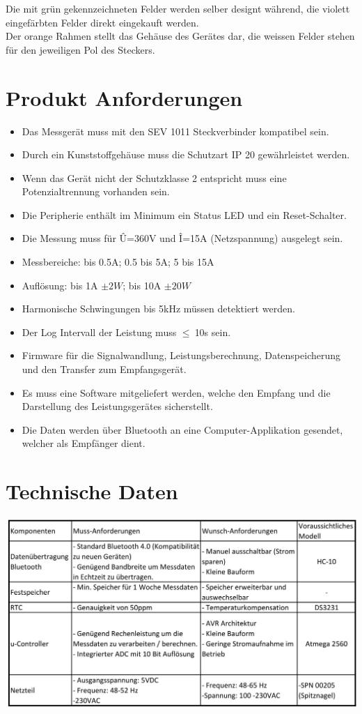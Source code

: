 \documentclass[12pt,a4paper]{article}
\begin{document}
Die mit grün gekennzeichneten Felder werden selber designt während, die violett eingefärbten Felder direkt eingekauft werden.\\
Der orange Rahmen stellt das Gehäuse des Gerätes dar, die weissen Felder stehen für den jeweiligen Pol des Steckers.

\newpage
\section{Produkt Anforderungen}
\begin{itemize}
\item Das Messgerät muss mit den SEV 1011 Steckverbinder kompatibel sein.
\item Durch ein Kunststoffgehäuse muss die Schutzart IP 20 gewährleistet werden.
\item Wenn das Gerät nicht der Schutzklasse 2 entspricht muss eine Potenzialtrennung vorhanden sein.
\item Die Peripherie enthält im Minimum ein Status LED und ein Reset-Schalter.
\item Die Messung muss für Û=360V und Î=15A (Netzspannung) ausgelegt sein.
\item Messbereiche: bis 0.5A; 0.5 bis 5A; 5 bis 15A
\item Auflösung: bis 1A $\pm2W$; bis 10A $\pm 20W$
\item Harmonische Schwingungen bis 5kHz müssen detektiert werden.
\item Der Log Intervall der Leistung muss $\leq \ $10s sein.

\item Firmware für die Signalwandlung, Leistungsberechnung, Datenspeicherung und den Transfer zum Empfangsgerät.
\item Es muss eine Software mitgeliefert werden, welche den Empfang und die Darstellung des Leistungsgerätes sicherstellt. 

\item Die Daten werden über Bluetooth an eine Computer-Applikation gesendet, welcher als Empfänger dient. 
\end{itemize}


\section{Technische Daten}

 \includegraphics[scale=0.45]{Komp-1.png}
\end{document}
